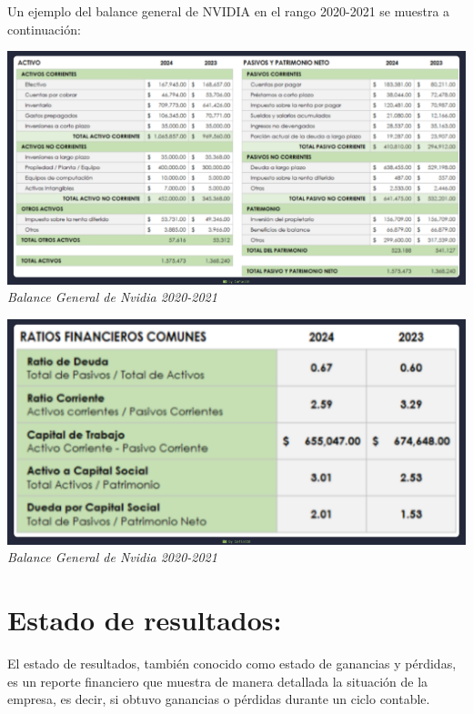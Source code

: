 \documentclass{article}
\begin{document}
Un ejemplo del balance general de NVIDIA en el rango 2020-2021 se muestra a continuación:


\begin{center}
  \includegraphics[width=15cm]{./assets/financiero.png}
  \textit{Balance General de Nvidia 2020-2021}
\end{center}

\begin{center}
  \includegraphics[width=15cm]{./assets/f2.png}
  \textit{Balance General de Nvidia 2020-2021}
\end{center}

\newpage
\section{Estado de resultados:}

El estado de resultados, también conocido como estado de ganancias y pérdidas, es un reporte financiero que muestra de manera detallada la situación de la empresa, es decir, si obtuvo ganancias o pérdidas durante un ciclo contable.
\end{document}
